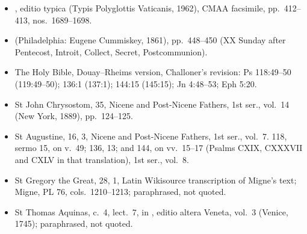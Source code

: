 {\footnotesize
\begin{itemize}\setlength{\itemsep}{0.15em}\setlength{\parskip}{0pt}
\item {}, editio typica (Typis Polyglottis Vaticanis, 1962), CMAA facsimile, pp.~412--413, nos.~1689--1698.
\item {} (Philadelphia: Eugene Cummiskey, 1861), pp.~448--450 (XX Sunday after Pentecost, Introit, Collect, Secret, Postcommunion).
\item The Holy Bible, Douay--Rheims version, Challoner's revision: Ps 118:49--50 (119:49--50); 136:1 (137:1); 144:15 (145:15); Jn 4:48--53; Eph 5:20.
\item St John Chrysostom,  35, Nicene and Post-Nicene Fathers, 1st ser., vol.~14 (New York, 1889), pp.~124--125.
\item St Augustine,  16, 3, Nicene and Post-Nicene Fathers, 1st ser., vol.~7.  118, sermo 15, on v.~49; 136, 13; and 144, on vv.~15--17 (Psalms CXIX, CXXXVII and CXLV in that translation), 1st ser., vol.~8.
\item St Gregory the Great,  28, 1, Latin Wikisource transcription of Migne's text; Migne, PL 76, cols.~1210--1213; paraphrased, not quoted.
\item St Thomas Aquinas,  c.~4, lect.~7, in , editio altera Veneta, vol.~3 (Venice, 1745); paraphrased, not quoted.
\end{itemize}
\par}
